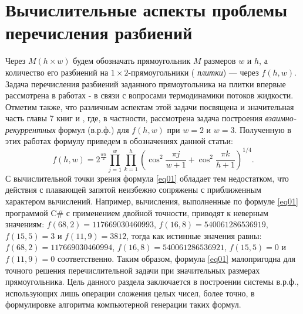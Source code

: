 \chapter{Вычислительные аспекты проблемы перечисления разбиений}









Через $M(h\times w)$ будем обозначать прямоугольник $M$ размеров $w$ и $h$, а количество его разбиений на $1\times 2$-прямоугольники (\textit{ плитки}) --- через $f(h,w)$.
Задача перечисления разбиений заданного прямоугольника на плитки впервые рассмотрена в работах \cite{2}-\cite{3} в связи с вопросами термодинамики потоков жидкости. Отметим также, что различным аспектам этой задачи посвящена и значительная часть главы 7 книг \cite{6} и \cite{7}, где, в частности, рассмотрена задача построения \textit{ взаимно-рекуррентных} формул (в.р.ф.) для $f(h,w)$ при $w=2$ и $w=3$. Полученную в этих работах формулу приведем в обозначениях данной статьи:
\begin{equation}\label{eq01}
f(h,w)=2^{\frac{wh}{2}}\prod_{j=1}^{w} \prod_{k=1}^{h}
\left(
\cos^2{\frac{\pi j}{w+1}}
+\cos^2{\frac{\pi k}{h+1}}
\right)^{1/4}.
\end{equation}
С вычислительной точки зрения формула \eqref{eq01} обладает тем недостатком, что действия с плавающей запятой неизбежно сопряжены с приближенным характером вычислений. Например, вычисления, выполненные по формуле \eqref{eq01} программой C\# с применением двойной точности, приводят к неверным значениям: $f(68,2)=117669030460993$, $f(16,8)=540061286536919$, $f(15,5)=3$ и $f(11,9)=3812$, тогда как истинные значения равны: $f(68,2)=117669030460994$, $f(16,8)=540061286536921$, $f(15,5)=0$ и $f(11,9)=0$ соответственно. Таким образом, формула \eqref{eq01} малопригодна для точного решения перечислительной задачи при значительных размерах прямоугольника.
Цель данного раздела заключается в построении системы в.р.ф., использующих лишь операции сложения целых чисел, более точно, в формулировке алгоритма компьютерной генерации таких формул.

